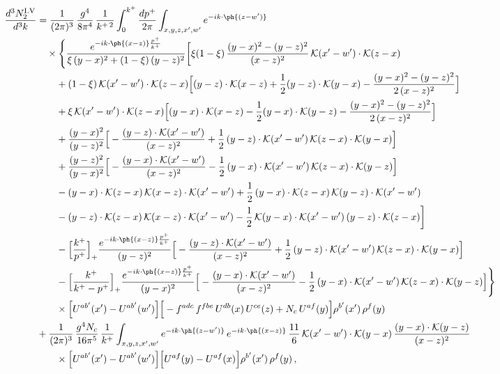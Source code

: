 \begin{align}
\frac{d^{3}N^{\rm I.V}_{2}}{d^{3}k} & =\frac{1}{(2\pi)^{3}}\,\frac{g^{4}}{8\pi^{4}}\,\frac{1}{k^{+\,2}}\int_{0}^{k^{+}}\frac{dp^{+}}{2\pi}\int_{x,y,z,x',w'}e^{-ik\cdot\ph{(z-w')}}\notag\\
&\quad\times\Bigg\{\frac{e^{-ik\cdot\ph{(x-z)}\frac{p^{+}}{k^{+}}}}{\xi\,(y-x)^{2}+(1-\xi)\,(y-z)^{2}}\bigg[\xi(1-\xi)\,\frac{(y-x)^{2}-(y-z)^{2}}{(x-z)^{2}}\,\mathcal{K}(x'-w')\cdot\mathcal{K}(z-x)\notag\\
&\qquad+(1-\xi)\,\mathcal{K}(x'-w')\cdot\mathcal{K}(z-x)\Big[(y-z)\cdot\mathcal{K}(x-z)+\frac{1}{2}(y-z)\cdot\mathcal{K}(y-x)-\frac{(y-x)^{2}-(y-z)^{2}}{2\,(x-z)^{2}}\Big]\notag\\
&\qquad+\xi\,\mathcal{K}(x'-w')\cdot\mathcal{K}(z-x)\Big[(y-x)\cdot\mathcal{K}(x-z)-\frac{1}{2}(y-x)\cdot\mathcal{K}(y-z)-\frac{(y-x)^{2}-(y-z)^{2}}{2\,(x-z)^{2}}\Big]\notag\\
&\qquad+\frac{(y-x)^{2}}{(y-z)^{2}}\Big[-\frac{(y-z)\cdot\mathcal{K}(x'-w')}{(x-z)^{2}}+\frac{1}{2}\,(y-z)\cdot\mathcal{K}(x'-w')\,\mathcal{K}(z-x)\cdot\mathcal{K}(y-x)\Big]\notag\\
&\qquad+\frac{(y-z)^{2}}{(y-x)^{2}}\Big[-\frac{(y-x)\cdot\mathcal{K}(x'-w')}{(x-z)^{2}}-\frac{1}{2}\,(y-x)\cdot\mathcal{K}(x'-w')\,\mathcal{K}(z-x)\cdot\mathcal{K}(y-z)\Big]\notag\\
&\qquad-(y-x)\cdot\mathcal{K}(z-x)\,\mathcal{K}(x-z)\cdot\mathcal{K}(x'-w')+\frac{1}{2}\,(y-x)\cdot\mathcal{K}(z-x)\,\mathcal{K}(y-z)\cdot\mathcal{K}(x'-w')\notag\\
&\qquad-(y-z)\cdot\mathcal{K}(z-x)\,\mathcal{K}(x-z)\cdot\mathcal{K}(x'-w')-\frac{1}{2}\,\mathcal{K}(y-x)\cdot\mathcal{K}(x'-w')\,(y-z)\cdot\mathcal{K}(z-x)\bigg]\notag\\
&\qquad-\Big[\frac{k^{+}}{p^{+}}\Big]_{+}\frac{e^{-ik\cdot\ph{(x-z)}\frac{p^{+}}{k^{+}}}}{(y-z)^{2}}\Big[-\frac{(y-z)\cdot\mathcal{K}(x'-w')}{(x-z)^{2}}+\frac{1}{2}\,(y-z)\cdot\mathcal{K}(x'-w')\,\mathcal{K}(z-x)\cdot\mathcal{K}(y-x)\Big]\notag\\
&\qquad-\Big[\frac{k^{+}}{k^{+}-p^{+}}\Big]_{+}\frac{e^{-ik\cdot\ph{(x-z)}\frac{p^{+}}{k^{+}}}}{(y-x)^{2}}\Big[-\frac{(y-x)\cdot\mathcal{K}(x'-w')}{(x-z)^{2}}-\frac{1}{2}\,(y-x)\cdot\mathcal{K}(x'-w')\,\mathcal{K}(z-x)\cdot\mathcal{K}(y-z)\Big]\Bigg\}\notag\\
&\qquad\times\Big[U^{ab'}(x')-U^{ab'}(w')\Big]\Big[-f^{adc}\,f^{fbe}\,U^{db}(x)\,U^{ce}(z)+N_{c}\,U^{af}(y)\Big]\rho^{b'}(x')\,\rho^{f}(y)\notag\\
&+\frac{1}{(2\pi)^{3}}\,\frac{g^{4}N_{c}}{16\pi^{5}}\,\frac{1}{k^{+}}\int_{x,y,z,x',w'}e^{-ik\cdot\ph{(z-w')}}\,e^{-ik\cdot\ph{(x-z)}}\,\frac{11}{6}\,\mathcal{K}(x'-w')\cdot\mathcal{K}(y-x)\,\frac{(y-x)\cdot\mathcal{K}(y-z)}{(x-z)^{2}}\notag\\
&\qquad\times\Big[U^{ab'}(x')-U^{ab'}(w')\Big]\Big[U^{af}(y)-U^{af}(x)\Big]\rho^{b'}(x')\,\rho^{f}(y)\,,\label{eq:B-I5two}
\end{align}
